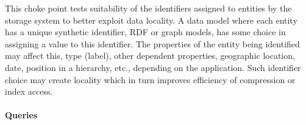 
This choke point tests suitability of the identifiers assigned to entities by
the storage system to better exploit data locality. A data model where each
entity has a unique synthetic identifier, \eg RDF or graph models, has some
choice in assigning a value to this identifier. The properties of the entity
being identified may affect this, \eg type (label), other dependent properties,
\eg geographic location, date, position in a hierarchy, etc., depending on the
application. Such identifier choice may create locality which in turn improves
efficiency of compression or index access.


\paragraph{Queries}
{\raggedright
}
